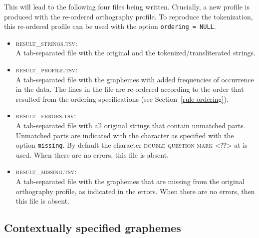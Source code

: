 \documentclass[output=book,nonflat,modfonts,
colorlinks, citecolor=brown,
		]{langsci/langscibook}\usepackage[]{graphicx}\usepackage[]{color}
\begin{document}
This will lead to the following four files being written. Crucially, a
new profile is produced with the re-ordered orthography profile. To reproduce
the tokenization, this re-ordered profile can be used with the option
\texttt{ordering~=~NULL}.

\begin{itemize}
  
   \item \textsc{result\_strings.tsv}:\\ A tab-separated file with the original
         and the tokenized/transliterated strings.

   \item \textsc{result\_profile.tsv}:\\ A tab-separated file with the
         graphemes with added frequencies of occurrence in the data. The lines
         in the file are re-ordered according to the order that resulted from the
         ordering specifications (see Section~\ref{rule-ordering}).

   \item \textsc{result\_errors.tsv}:\\ A tab-separated file with all original
         strings that contain unmatched parts. Unmatched parts are indicated
         with the character as specified with the option \texttt{missing}. By
         default the character \textsc{double question mark} <⁇> at
          is used. When there are no errors, this file is 
         absent.

    \item \textsc{result\_missing.tsv}:\\ A tab-separated file with the graphemes
          that are missing from the original orthography profile, as indicated in
          the errors. When there are no errors, then this file is absent.
          
\end{itemize}

\subsection*{Contextually specified graphemes}
\label{contextual-specification}
\end{document}
